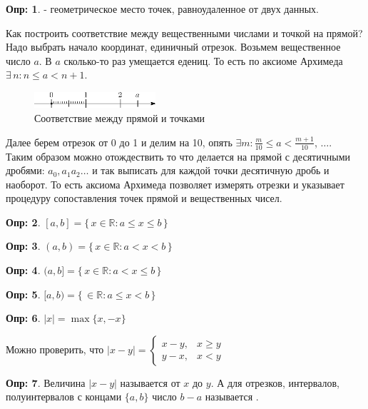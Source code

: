 \documentclass[12pt]{article}
\theoremstyle{definition}
\newtheorem{defn}{Опр:}
\begin{document}
\begin{defn}
	 - геометрическое место точек, равноудаленное от двух данных.
\end{defn}

Как построить соответствие между вещественными числами и точкой на прямой?
Надо выбрать начало координат, единичный отрезок. Возьмем вещественное число $a$. В $a$ сколько-то раз умещается едениц. То есть по аксиоме Архимеда $\exists \, n\colon n \leq a < n+1$.

\begin{figure}[H]
	\centering
	\includegraphics[width=0.4\textwidth]{7_1.eps}
	\caption{Соответствие между прямой и точками}
	\label{fig:7_1}
\end{figure}

Далее берем отрезок от 0 до 1 и делим на 10, опять $\exists m\colon \frac{m}{10} \leq a < \frac{m+1}{10}$, $\dotsc$.\\
Таким образом можно отождествить то что делается на прямой с десятичными дробями: $a_0{,}a_1a_2\dotsc$ и так выписать для каждой точки десятичную дробь и наоборот. То есть аксиома Архимеда позволяет измерять отрезки и указывает процедуру сопоставления точек прямой и вещественных чисел.
 
\begin{defn}
 	 $[a,b] = \{\,x \in \mathbb{R} \colon a\leq x \leq b\,\}$
\end{defn}
\begin{defn}
	 $(a,b) = \{\,x \in \mathbb{R} \colon a < x < b\,\}$
\end{defn}
\begin{defn}
	 $(a,b] = \{\,x \in \mathbb{R} \colon a < x \leq b\,\}$
\end{defn}
\begin{defn}
	 $[a,b) = \{\, \in \mathbb{R} \colon a\leq x < b\,\}$
\end{defn}
\begin{defn}
	 $|x| = \max\{x, -x\}$
\end{defn}

Можно проверить, что $|x-y| = \begin{cases} 
	x-y, & x \geq y\\
	y-x, & x < y
\end{cases}$

\begin{defn}
	Величина $|x-y|$  называется  от $x$ до $y$. А для отрезков, интервалов, полуинтервалов с концами $\{a, b\}$ число $b-a$ называется . 
\end{defn}
\end{document}
